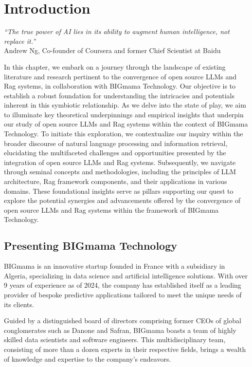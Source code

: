 \chapter{Introduction}

\begin{flushright}
    \small{\textit{``The true power of AI lies in its ability to augment human intelligence, not replace it.''}\\
        Andrew Ng, Co-founder of Coursera and former Chief Scientist at Baidu}
\end{flushright}

In this chapter, we embark on a journey through the landscape of existing literature and research pertinent to the convergence of open source LLMs and Rag systems, in collaboration with BIGmama Technology. Our objective is to establish a robust foundation for understanding the intricacies and potentials inherent in this symbiotic relationship. As we delve into the state of play, we aim to illuminate key theoretical underpinnings and empirical insights that underpin our study of open source LLMs and Rag systems within the context of BIGmama Technology. To initiate this exploration, we contextualize our inquiry within the broader discourse of natural language processing and information retrieval, elucidating the multifaceted challenges and opportunities presented by the integration of open source LLMs and Rag systems. Subsequently, we navigate through seminal concepts and methodologies, including the principles of LLM architecture, Rag framework components, and their applications in various domains. These foundational insights serve as pillars supporting our quest to explore the potential synergies and advancements offered by the convergence of open source LLMs and Rag systems within the framework of BIGmama Technology.

\section{Presenting BIGmama Technology}

BIGmama is an innovative startup founded in France with a subsidiary in Algeria, specializing in data science and artificial intelligence solutions. With over 9 years of experience as of 2024, the company has established itself as a leading provider of bespoke predictive applications tailored to meet the unique needs of its clients.

Guided by a distinguished board of directors comprising former CEOs of global conglomerates such as Danone and Safran, BIGmama boasts a team of highly skilled data scientists and software engineers. This multidisciplinary team, consisting of more than a dozen experts in their respective fields, brings a wealth of knowledge and expertise to the company's endeavors.

